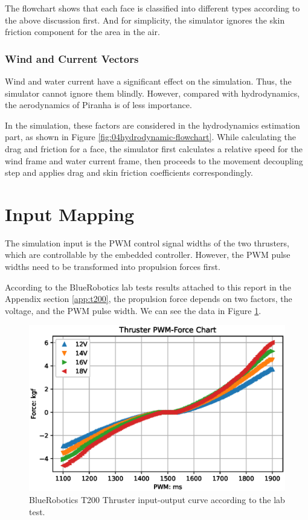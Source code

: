 The flowchart shows that each face is classified into different types according to the above discussion first. And for simplicity, the simulator ignores the skin friction component for the area in the air.

\subsubsection{Wind and Current Vectors}

Wind and water current have a significant effect on the simulation. Thus, the simulator cannot ignore them blindly. However, compared with hydrodynamics, the aerodynamics of Piranha is of less importance.

In the simulation, these factors are considered in the hydrodynamics estimation part, as shown in Figure \ref{fig:04hydrodynamic-flowchart}. While calculating the drag and friction for a face, the simulator first calculates a relative speed for the wind frame and water current frame, then proceeds to the movement decoupling step and applies drag and skin friction coefficients correspondingly.

\section{Input Mapping}

The simulation input is the PWM control signal widths of the two thrusters, which are controllable by the embedded controller. However, the PWM pulse widths need to be transformed into propulsion forces first.

According to the BlueRobotics lab tests results attached to this report in the Appendix section \ref{app:t200}, the propulsion force depends on two factors, the voltage, and the PWM pulse width. We can see the data in Figure \ref{fig:04thruster-curve}.

\begin{figure}[H]
    \centering
    \includegraphics[width=\textwidth]{images/04thruster-curve.eps}
    \caption{BlueRobotics T200 Thruster input-output curve according to the lab test.}
    \label{fig:04thruster-curve}
\end{figure}

